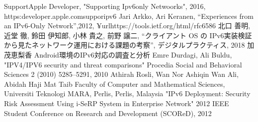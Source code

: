 \documentclass[a4j]{jarticle}
\begin{document}
\newpage
\begin{thebibliography}{99}
	
	Support\-Apple Developer, "Supporting Ipv6\-only Netwoorks", 2016, https:\/\/developer.apple.com\/suppor\/ipv6
	Jari Arkko, Ari Keranen,  ``Experiences from an IPv6-Only Network'',2012, ¥url{https://tools.ietf.org/html/rfc6586}
	北口 善明, 近堂 徹, 鈴田 伊知郎, 小林 貴之, 前野 譲二, “クライアント OS の IPv6実装検証から見たネットワーク運用における課題の考察”, デジタルプラクティス, 2018
	加茂恵梨香 Android環境のIPv6対応の調査と分析
	Emre Durdagi, Ali Buldu, "IPV4/IPV6 security and threat comparisons" Procedia Social and Behavioral Sciences 2 (2010) 5285–5291, 2010
	Athirah Rosli, Wan Nor Ashiqin Wan Ali, Abidah Haji Mat Taib  Faculty of Computer and Mathematical Sciences, Universiti Teknologi MARA, Perlis, Perlis, Malaysia  "IPv6 Deployment: Security Risk Assessment Using i-SeRP System in Enterprise Network" 2012 IEEE Student Conference on Research and Development (SCOReD), 2012
\end{thebibliography}
\end{document}
